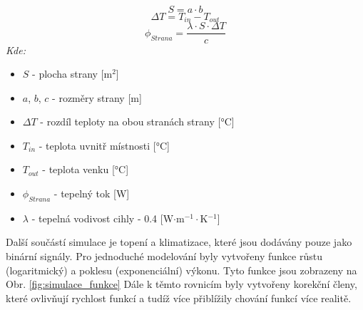 \begin{equation}
    S = a \cdot b
    \label{eq:plocha}
\end{equation}
\begin{equation}
    \Delta T = T_{in} - T_{out}
    \label{eq:rozdil_teplot}
\end{equation}
\begin{equation}
    \phi _{Strana} = \frac{\lambda \cdot S \cdot \Delta T}{c}
    \label{eq:tepelny_tok}
\end{equation}
\noindent\textit{Kde:}
\begin{itemize}
    \item $S$ - plocha strany [m$^2$]
    \item $a$, $b$, $c$ - rozměry strany [m]
    \item $\Delta T$ - rozdíl teploty na obou stranách strany [°C]
    \item $T_{in}$ - teplota uvnitř místnosti [°C]
    \item $T_{out}$ - teplota venku [°C]
    \item $\phi _{Strana}$ - tepelný tok [W]
    \item $\lambda$ - tepelná vodivost cihly - 0.4 [W$\cdot$m$^{-1}\cdot$K$^{-1}$] \newline
\end{itemize}
\noindent Další součástí simulace je topení a klimatizace, které jsou dodávány pouze jako binární signály. Pro jednoduché modelování byly vytvořeny funkce růstu (logaritmický) a poklesu (exponenciální) výkonu. Tyto funkce jsou zobrazeny na Obr. \ref{fig:simulace_funkce} Dále k těmto rovnicím byly vytvořeny korekční členy, které ovlivňují rychlost funkcí a tudíž více přiblížily chování funkcí více realitě.

